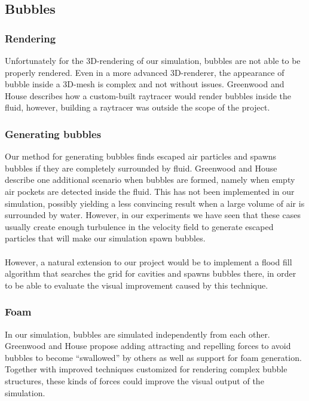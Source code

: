 \documentclass[twocolumn]{article}
\begin{document}
\subsection{Bubbles}
\subsubsection{Rendering}
Unfortunately for the 3D-rendering of our simulation, bubbles are not able to be properly rendered. Even in a more advanced 3D-renderer, the appearance of bubble inside a 3D-mesh is complex and not without issues. Greenwood and House describes how a custom-built raytracer would render bubbles inside the fluid, however, building a raytracer was outside the scope of the project.

\subsubsection{Generating bubbles}
Our method for generating bubbles finds escaped air particles and spawns bubbles if they are completely surrounded by fluid. Greenwood and House describe one additional scenario when bubbles are formed, namely when empty air pockets are detected inside the fluid. This has not been implemented in our simulation, possibly yielding a less convincing result when a large volume of air is surrounded by water. However, in our  experiments we have seen that these cases usually create enough turbulence in the velocity field to generate escaped particles that will make our simulation spawn bubbles.
\\\\
However, a natural extension to our project would be to implement a flood fill algorithm that searches the grid for cavities and spawns bubbles there, in order to be able to evaluate the visual improvement caused by this technique. 

\subsubsection{Foam}
In our simulation, bubbles are simulated independently from each other. Greenwood and House propose adding attracting and repelling forces to avoid bubbles to become ``swallowed'' by others as well as support for foam generation. Together with improved techniques customized for rendering complex bubble structures, these kinds of forces could improve the visual output of the simulation.
\end{document}
